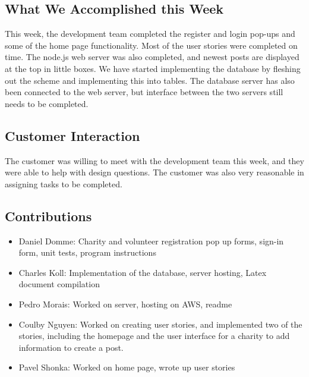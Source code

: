 \documentclass[12pt]{article}
\begin{document}
\subsection{What We Accomplished this Week}
	This week, the development team completed the register and login pop-ups and
	some of the home page functionality. Most of the user stories were completed on
	time. The node.js web server was also completed, and newest posts are displayed
	at the top in little boxes. We have started implementing the database by
	fleshing out the scheme and implementing this into tables. The database server has
	also been connected to the web server, but interface between the two servers
	still needs to be completed.
\subsection{Customer Interaction}
	The customer was willing to meet with the development team this week, and they
	were able to help with design questions. The customer was also very reasonable in
	assigning tasks to be completed.

\quad

\subsection{Contributions}
\begin{itemize}
\item
	Daniel Domme: Charity and volunteer registration pop up forms, sign-in form, unit
		tests, program instructions
\item
	Charles Koll: Implementation of the database, server hosting, Latex document compilation
\item
	Pedro Morais: Worked on server, hosting on AWS, readme
\item
	Coulby Nguyen: Worked on creating user stories, and implemented two of
		the stories, including the homepage and the user interface for a
		charity to add information to create a post.
\item
	Pavel Shonka: Worked on home page, wrote up user stories
\end{itemize}
\end{document}
